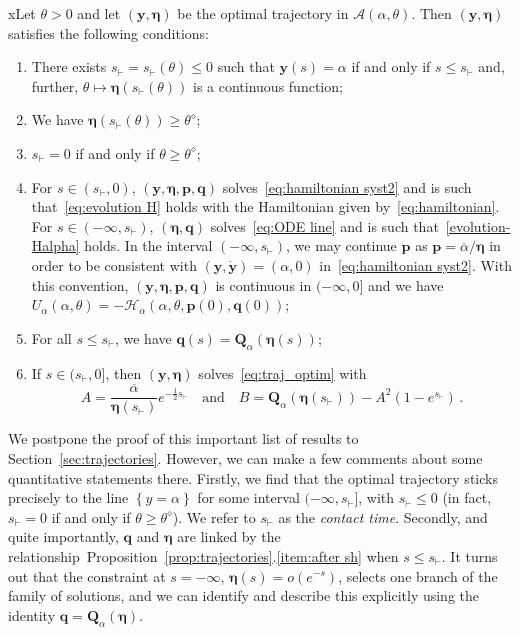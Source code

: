 \documentclass[10pt]{amsart}
\theoremstyle{definition}\newtheorem{defi}[theo]{Definition}\newtheorem{rema}[theo]{Remark}\newtheorem{exam}[theo]{Example}\newtheorem{exem}[theo]{Example}\newtheorem{nota}[theo]{Notation}
\newcommand{\bp}{\mathbf{p}}
\newcommand{\bq}{\mathbf{q}}
\newcommand{\bQ}{\mathbf{Q}}
\newcommand{\by}{\mathbf{y}}
\newcommand{\bA}{\mathscr{A}}
\newcommand{\bH}{\mathscr{H}}
\newcommand{\beeta}{\boldsymbol{\eta}}
\newcommand{\1}{\mathds{1}}
\newcommand{\Thetastar}{\theta^{\diamond}}
\newcommand{\shh}{s_{\vdash}}
\newcommand*{\romanenumi}{\renewcommand*{\theenumi}{\roman{enumi}}}
\begin{document}
\begin{prop}\label{prop:trajectories}
xLet $\theta> 0$ and let $(\by,\beeta)$ be the optimal trajectory in $\bA(\alpha,\theta)$. Then $(\by,\beeta)$ satisfies the following conditions:
\begin{enumerate}\romanenumi
\item \label{item:sh}
There exists $\shh = \shh(\theta)\leq 0$ such that $\by(s) = \alpha$ if and only if $s \leq \shh$ and, further, $\theta\mapsto \beeta\left (\shh(\theta)\right)$ is a continuous function;
\item \label{item:Q}
We have $\beeta(\shh(\theta)) \geq \Thetastar$;
\item \label{item:sh=0}
$\shh = 0$ if and only if $\theta \geq \Thetastar$;
\item \label{item:continuous}
For $s \in (\shh,0)$, $(\by,\beeta,\bp,\bq)$ solves~\eqref{eq:hamiltonian syst2} and is such that~\eqref{eq:evolution H} holds with the Hamiltonian given by~\eqref{eq:hamiltonian}. For $s \in (-\infty,\shh)$, $(\beeta, \bq)$ solves~\eqref{eq:ODE line} and is such that~\eqref{evolution-Halpha} holds. In the interval $(-\infty,\shh)$, we may continue $\bp$ as $\bp=\overline{\alpha}/ \beeta$ in order to be consistent with $(\by,\dot{\by})=(\alpha,0)$ in~\eqref{eq:hamiltonian syst2}. With this convention, $(\by,\beeta,\bp,\bq)$ is continuous in $(-\infty,0]$ and we have $U_\alpha(\alpha,\theta) = - \bH_\alpha(\alpha,\theta,\bp(0),\bq(0))$;
\item \label{item:after sh}
For all $s\leq \shh$, we have $\bq(s) = \bQ_\alpha(\beeta(s))$;
\item \label{item:A,B}
If $s \in (\shh,0]$, then $(\by,\beeta)$ solves~\eqref{eq:traj_optim} with
\begin{equation*}
A = \dfrac{\overline\alpha}{\beeta(\shh)} e^{-\frac 1 2\shh}\quad \text{and}\quad B = \bQ_\alpha(\beeta(\shh)) - A^2\left (1-e^{\shh}\right)\,.
\end{equation*}
\end{enumerate}
\end{prop}

We postpone the proof of this important list of results to Section~\ref{sec:trajectories}. However, we can make a few comments about some quantitative statements there. Firstly, we find that the optimal trajectory sticks precisely to the line $\left\{y = \alpha\right\}$ for some interval $(-\infty, \shh]$, with $\shh\leq 0$ (in fact, $\shh = 0$ if and only if $\theta \geq \Thetastar$). We refer to $\shh$ as the {\em contact time}. Secondly, and quite importantly, $\bq$ and $\beeta$ are linked by the relationship~Proposition~\ref{prop:trajectories}.\eqref{item:after sh} when $s\leq \shh$. It turns out that the constraint at $s = -\infty$, $\beeta(s) = o(e^{-s})$, selects one branch of the family of solutions, and we can identify and describe this explicitly using the identity $\bq = \bQ_\alpha(\beeta)$.
\end{document}
